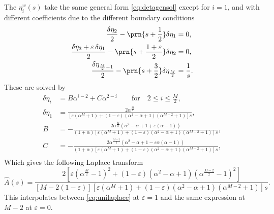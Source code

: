 \documentclass[12pt]{article}
\begin{document}
The $\eta^w_i(s)$ take the same general form \eqref{eq:detagensol} except for $i=1$, and with different coefficients due to the different boundary conditions
%
\begin{equation}\label{eq:detabndshorten}
\begin{aligned}
  \frac{\delta\eta_2}{2} - \prn{s+\frac{1}{2}}\delta\eta_1 &= 0, \\
  \frac{\delta\eta_3 + \varepsilon\,\delta\eta_1}{2} - \prn{s+\frac{1+\varepsilon}{2}}\delta\eta_2 &= 0, \\
  \frac{\delta\eta_{\frac{M}{2}-1}}{2} - \prn{s+\frac{3}{2}}\delta\eta_{\frac{M}{2}} &= \frac{1}{s}.
\end{aligned}
\end{equation}
%
These are solved by
%
%
\begin{equation}\label{eq:shortensol}
\begin{aligned}
  \delta\eta_i &= B\alpha^{i-2} + C\alpha^{2-i} \qquad
        \text{for} \quad 2 \leq i \leq \frac{M}{2}, \\
  \delta\eta_1 &= \frac{2\alpha^{\frac{M}{2}}}
         {[\varepsilon(\alpha^{M}+1) + (1-\varepsilon)(\alpha^2-\alpha+1)(\alpha^{M-2}+1)]s}, \\
  B &= - \frac{2\alpha^{\frac{M}{2}}(\alpha^2-\alpha+1 + \varepsilon(\alpha-1))}
         {(1+\alpha)[\varepsilon(\alpha^{M}+1) + (1-\varepsilon)(\alpha^2-\alpha+1)(\alpha^{M-2}+1)]s}, \\
  C &= - \frac{2\alpha^{\frac{M-2}{2}}(\alpha^2-\alpha+1 - \varepsilon\alpha(\alpha-1))}
         {(1+\alpha)[\varepsilon(\alpha^{M}+1) + (1-\varepsilon)(\alpha^2-\alpha+1)(\alpha^{M-2}+1)]s}, \\
\end{aligned}
\end{equation}
%
Which gives the following Laplace transform
%
\begin{equation}\label{eq:shortenlaplace}
  \hat{A}(s) = \frac{2 [\varepsilon(\alpha^{\frac{M}{2}}-1)^2
          + (1-\varepsilon)(\alpha^2-\alpha+1)(\alpha^{\frac{M-2}{2}}-1)^2] }
          { [M-2(1-\varepsilon)]
            [\varepsilon(\alpha^{M}+1) + (1-\varepsilon)(\alpha^2-\alpha+1)(\alpha^{M-2}+1)]s }.
\end{equation}
%
This interpolates between \eqref{eq:unilaplace} at $\varepsilon=1$ and the same expression at $M-2$ at $\varepsilon=0$.
\end{document}
